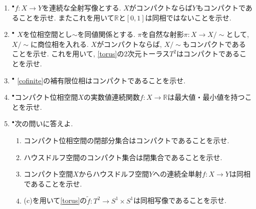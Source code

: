 \documentclass[dvipdfmx,a4paper,11pt]{article}
\newcommand{\R}{\mathbb{R}}
\newcommand{\C}{\mathbb{C}}
\theoremstyle{definition}
\begin{document}
\begin{enumerate}[label=\textbf{問}\ref*{sec-compact}.\arabic*]
	\setlength{\parskip}{0cm} 
  \setlength{\itemsep}{7pt} 

\item $^{\bullet}$$f : X \rightarrow Y$を連続な全射写像とする. $X$がコンパクトならば$Y$もコンパクトであることを示せ. またこれを用いて$\R$と$[0,1]$は同相ではないことを示せ.

\item $^{\bullet}$ $X$を位相空間とし$\sim$を同値関係とする. $\pi$を自然な射影$\pi : X\to X/\sim $として, $X/\sim$に商位相を入れる. $X$がコンパクトならば, $X/\sim$もコンパクトであることを示せ. これを用いて, \ref{torus}の2次元トーラス$T^2$はコンパクトであることを示せ. 

\item $^{\bullet}$ \ref{cofinite}の補有限位相はコンパクトであることを示せ.

\item $^{\bullet}$コンパクト位相空間$X$の実数値連続関数$f : X \rightarrow \R$は最大値・最小値を持つことを示せ.




\item \label{compact_to_Hausdorff}$^{\bullet}$次の問いに答えよ. 
\begin{enumerate}
	\setlength{\parskip}{0cm} 
  \setlength{\itemsep}{0pt} 
\item コンパクト位相空間の閉部分集合はコンパクトであることを示せ. 
\item ハウスドルフ空間のコンパクト集合は閉集合であることを示せ.
\item コンパクト空間$X$からハウスドルフ空間$Y$への連続全単射$f : X \rightarrow Y$は同相であることを示せ.　
\item (c)を用いて\ref{torus}の$\widetilde{f}: T^2 \to S^1 \times S^1$は同相写像であることを示せ.
\end{enumerate}


\end{enumerate}
\end{document}
